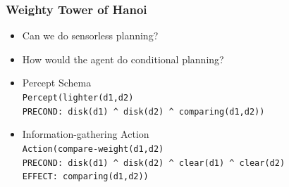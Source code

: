 \documentclass[compress, 9pt]{beamer}
\begin{document}
\begin{frame}
\frametitle{Weighty Tower of Hanoi}
\label{sec-1-4}
\begin{itemize}

\item <1-> Can we do sensorless planning?
\label{sec-1-4-1}%

\item <2-> How would the agent do conditional planning?
\label{sec-1-4-2}%

\item <3-> Percept Schema\\
\label{sec-1-4-3}%
\texttt{Percept(lighter(d1,d2)}\\
   \texttt{PRECOND: disk(d1) \textasciicircum{} disk(d2) \textasciicircum{} comparing(d1,d2))}

\item <4-> Information-gathering Action\\
\label{sec-1-4-4}%
\texttt{Action(compare-weight(d1,d2)}\\
   \texttt{PRECOND: disk(d1) \textasciicircum{} disk(d2) \textasciicircum{} clear(d1) \textasciicircum{} clear(d2)}\\
   \texttt{EFFECT: comparing(d1,d2))}

\end{itemize} %
\end{frame}
\end{document}
